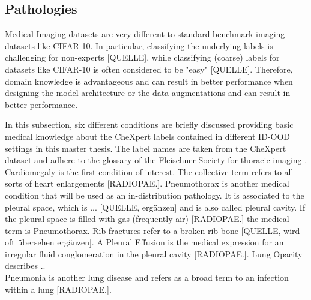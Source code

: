 \subsection{Pathologies}
Medical Imaging datasets are very different to standard benchmark imaging datasets like CIFAR-10.
In particular, classifying the underlying labels is challenging for non-experts [QUELLE], while classifying (coarse) labels for datasets like CIFAR-10 is often considered to be "easy" [QUELLE].
Therefore, domain knowledge is advantageous and can result in better performance when designing the model architecture or the data augmentations and can result in better performance.
\par
In this subsection, six different conditions are briefly discussed providing basic medical knowledge about the CheXpert labels contained in different ID-OOD settings in this master thesis.
The label names are taken from the CheXpert dataset \citep{Irvin2019} and adhere to the glossary of the Fleischner Society for thoracic imaging \citep{Hansell2008}.
\\
Cardiomegaly is the first condition of interest. The collective term refers to all sorts of heart enlargements [RADIOPAE.].
Pneumothorax is another medical condition that will be used as an in-distribution pathology.
It is associated to the pleural space, which is ... [QUELLE, ergänzen] and is also called pleural cavity.
If the pleural space is filled with gas (frequently air) [RADIOPAE.] the medical term is Pneumothorax.
Rib fractures refer to a broken rib bone [QUELLE, wird oft übersehen ergänzen].
A Pleural Effusion is the medical expression for an irregular fluid conglomeration in the pleural cavity [RADIOPAE.].
Lung Opacity describes .. \\
Pneumonia is another lung disease and refers as a broad term to an infection within a lung [RADIOPAE.]. 
